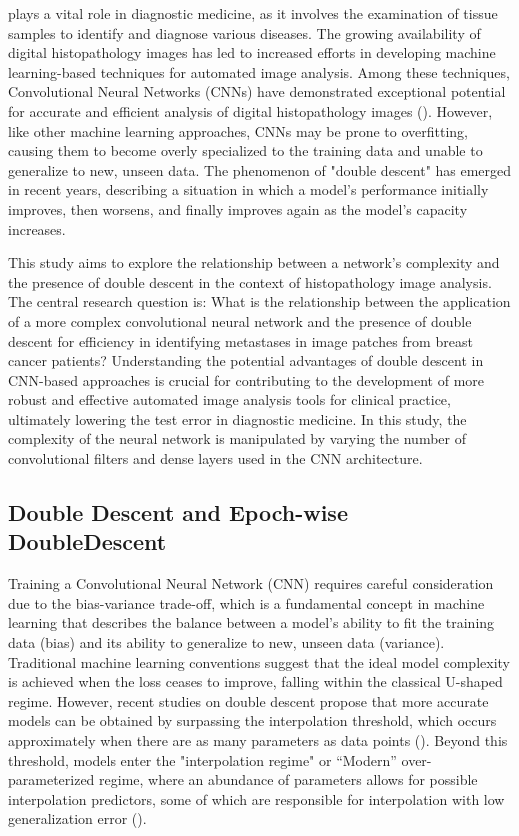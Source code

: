  plays a vital role in diagnostic medicine, as it involves the examination of tissue samples to identify and diagnose various diseases. The growing availability of digital histopathology images has led to increased efforts in developing machine learning-based techniques for automated image analysis. Among these techniques, Convolutional Neural Networks (CNNs) have demonstrated exceptional potential for accurate and efficient analysis of digital histopathology images (\cite{Wemmert2021DeepAnalysis}). However, like other machine learning approaches, CNNs may be prone to overfitting, causing them to become overly specialized to the training data and unable to generalize to new, unseen data. The phenomenon of "double descent" has emerged in recent years, describing a situation in which a model's performance initially improves, then worsens, and finally improves again as the model's capacity increases.

This study aims to explore the relationship between a network's complexity and the presence of double descent in the context of histopathology image analysis. The central research question is: What is the relationship between the application of a more complex convolutional neural network and the presence of double descent for efficiency in identifying metastases in image patches from breast cancer patients? Understanding the potential advantages of double descent in CNN-based approaches is crucial for contributing to the development of more robust and effective automated image analysis tools for clinical practice, ultimately lowering the test error in diagnostic medicine. In this study, the complexity of the neural network is manipulated by varying the number of convolutional filters and dense layers used in the CNN architecture.
\subsection{Double Descent and Epoch-wise DoubleDescent}
Training a Convolutional Neural Network (CNN) requires careful consideration due to the bias-variance trade-off, which is a fundamental concept in machine learning that describes the balance between a model's ability to fit the training data (bias) and its ability to generalize to new, unseen data (variance). Traditional machine learning conventions suggest that the ideal model complexity is achieved when the loss ceases to improve, falling within the classical U-shaped regime. However, recent studies on double descent propose that more accurate models can be obtained by surpassing the interpolation threshold, which occurs approximately when there are as many parameters as data points (\cite{Belkin2019ReconcilingTrade-off}). Beyond this threshold, models enter the "interpolation regime" or “Modern” over-parameterized regime, where an abundance of parameters allows for possible interpolation predictors, some of which are responsible for interpolation with low generalization error (\cite{Belkin2021FitInterpolation}).

